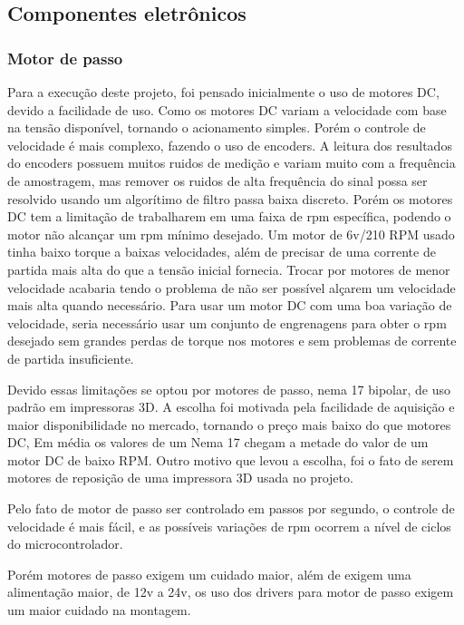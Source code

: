 \subsection{Componentes eletrônicos}

\subsubsection{Motor de passo}

Para a execução deste projeto, foi pensado inicialmente o uso de motores DC,  devido a facilidade de uso.
Como os motores DC variam a velocidade com base na tensão disponível, tornando o acionamento simples.
Porém o controle de velocidade é mais complexo, fazendo o uso de encoders.
A leitura dos resultados do encoders possuem muitos ruidos de medição e variam muito com a frequência de amostragem, 
mas remover os ruidos de alta frequência do sinal possa ser resolvido usando um algorítimo de filtro passa baixa discreto.
Porém os motores DC tem a limitação de trabalharem em uma faixa de rpm específica, podendo o motor não alcançar um rpm mínimo desejado.
Um motor de 6v/210 RPM usado tinha baixo torque a baixas velocidades, além de precisar de uma corrente de partida mais alta do que a tensão inicial fornecia.
Trocar por motores de menor velocidade acabaria tendo o problema de não ser possível alçarem um velocidade mais alta quando necessário.
Para usar um motor DC com uma boa variação de velocidade, seria necessário usar um conjunto de engrenagens para obter o rpm desejado sem grandes perdas de torque nos motores
e sem problemas de corrente de partida insuficiente.

Devido essas limitações se optou por motores de passo,  nema 17 bipolar, de uso padrão em impressoras 3D.
A escolha foi motivada pela facilidade de aquisição e maior disponibilidade no mercado, tornando o preço mais baixo do que motores DC,
Em média os valores de um Nema 17 chegam a metade do valor de um motor DC de baixo RPM.
Outro motivo que levou a escolha, foi o fato de serem motores de reposição de uma impressora 3D usada no projeto.

Pelo fato de motor de passo ser controlado em passos por segundo, o controle de velocidade é mais fácil,
e as possíveis variações de rpm ocorrem a nível de ciclos do microcontrolador.

Porém motores de passo exigem um cuidado maior, além de exigem uma alimentação maior, de 12v a 24v, os uso dos drivers para motor de passo exigem um maior cuidado na montagem.

